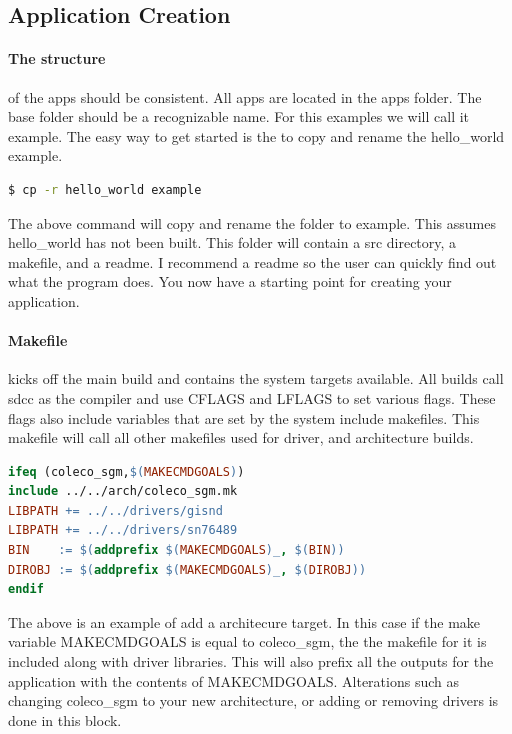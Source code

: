 \documentclass{article}
\begin{document}
  \subsection{Application Creation}

  \paragraph{The structure}of the apps should be consistent. All apps are located in the apps folder.
  The base folder should be a recognizable name. For this examples we will call it example.
  The easy way to get started is the to copy and rename the hello\_world example.
  \begin{lstlisting}[language=bash]
    $ cp -r hello_world example
  \end{lstlisting}
  The above command will copy and rename the folder to example. This assumes hello\_world has not been built.
  This folder will contain a src directory, a makefile, and a readme. I recommend a readme so the user can quickly find out what
  the program does. You now have a starting point for creating your application.

  \paragraph{Makefile}kicks off the main build and contains the system targets available. All builds call sdcc as the compiler and use
  CFLAGS and LFLAGS to set various flags. These flags also include variables that are set by the system include makefiles. This makefile
  will call all other makefiles used for driver, and architecture builds.

    \begin{lstlisting}[language=make]
ifeq (coleco_sgm,$(MAKECMDGOALS))
include ../../arch/coleco_sgm.mk
LIBPATH += ../../drivers/gisnd
LIBPATH += ../../drivers/sn76489
BIN    := $(addprefix $(MAKECMDGOALS)_, $(BIN))
DIROBJ := $(addprefix $(MAKECMDGOALS)_, $(DIROBJ))
endif
  \end{lstlisting}

  The above is an example of add a architecure target. In this case if the make variable MAKECMDGOALS is equal to coleco\_sgm, the the makefile for it is included along with driver libraries.
  This will also prefix all the outputs for the application with the contents of MAKECMDGOALS. Alterations such as changing coleco\_sgm to your new architecture, or adding or removing drivers
  is done in this block.
\end{document}
